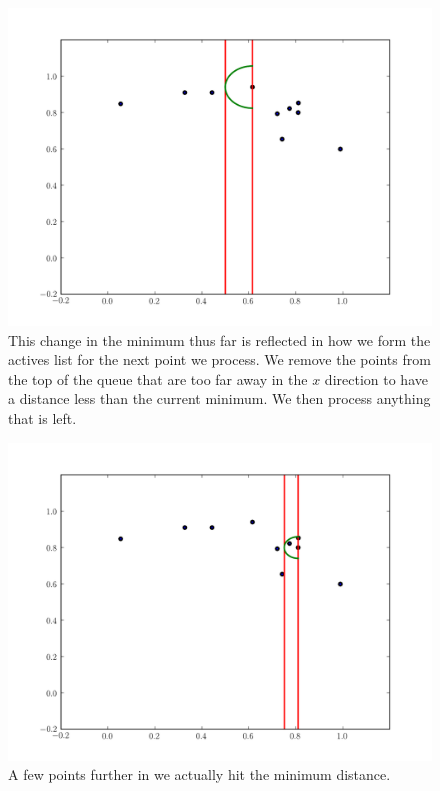 \begin{figure}[H]
\includegraphics[width = \textwidth]{simple1.pdf}
\caption{This change in the minimum thus far is reflected in how we form the actives list for the next point we process. 
We remove the points from the top of the queue that are too far away in the $x$ direction to have a distance less than the current minimum. 
We then process anything that is left.}
\end{figure}

\begin{figure}[H]
\includegraphics[width = \textwidth]{simple5.pdf}
\caption{A few points further in we actually hit the minimum distance.}
\end{figure}

